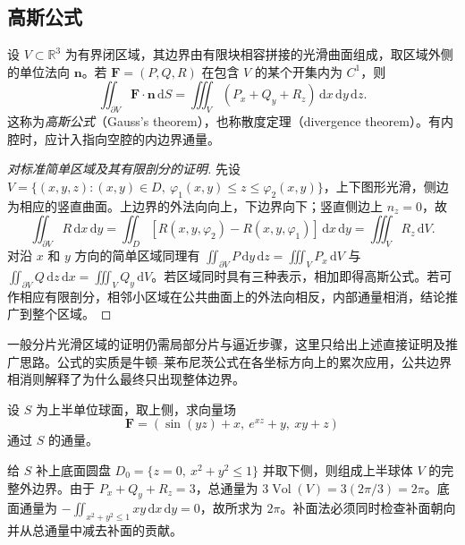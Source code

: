 \documentclass[UTF8,12pt,a4paper,fontset=fandol]{ctexbook}
\begin{document}
\subsection{高斯公式}
\label{subsec:gauss-formula}

\begin{theorem}[高斯公式]
\label{thm:gauss-formula}
设 $V\subset\mathbb R^3$ 为有界闭区域，其边界由有限块相容拼接的光滑曲面组成，取区域外侧的单位法向 $\boldsymbol n$。若 $\boldsymbol F=(P,Q,R)$ 在包含 $V$ 的某个开集内为 $C^1$，则
\begin{equation}
\label{eq:gauss-formula}
    \iint_{\partial V}\boldsymbol F\cdot\boldsymbol n\,\mathrm dS
    =\iiint_V(P_x+Q_y+R_z)\,\mathrm dx\,\mathrm dy\,\mathrm dz.
\end{equation}
这称为\emph{高斯公式}（Gauss's theorem），也称散度定理（divergence theorem）。有内腔时，应计入指向空腔的内边界通量。
\end{theorem}

\begin{proof}[对标准简单区域及其有限剖分的证明]
先设 $V=\{(x,y,z):(x,y)\in D,\ \varphi_1(x,y)\leq z\leq\varphi_2(x,y)\}$，上下图形光滑，侧边为相应的竖直曲面。上边界的外法向向上，下边界向下；竖直侧边上 $n_z=0$，故
\[
    \iint_{\partial V}R\,\mathrm dx\,\mathrm dy
    =\iint_D[R(x,y,\varphi_2)-R(x,y,\varphi_1)]\,\mathrm dx\,\mathrm dy
    =\iiint_V R_z\,\mathrm dV.
\]
对沿 $x$ 和 $y$ 方向的简单区域同理有 $\iint_{\partial V}P\,\mathrm dy\,\mathrm dz=\iiint_VP_x\,\mathrm dV$ 与 $\iint_{\partial V}Q\,\mathrm dz\,\mathrm dx=\iiint_VQ_y\,\mathrm dV$。若区域同时具有三种表示，相加即得高斯公式。若可作相应有限剖分，相邻小区域在公共曲面上的外法向相反，内部通量相消，结论推广到整个区域。
\end{proof}

一般分片光滑区域的证明仍需局部分片与逼近步骤，这里只给出上述直接证明及推广思路。公式的实质是牛顿--莱布尼茨公式在各坐标方向上的累次应用，公共边界相消则解释了为什么最终只出现整体边界。

\begin{example}
\label{ex:gauss-close-hemisphere}
设 $S$ 为上半单位球面，取上侧，求向量场
\[
    \boldsymbol F=(\sin(yz)+x,\ e^{xz}+y,\ xy+z)
\]
通过 $S$ 的通量。
\end{example}
\begin{solve}
给 $S$ 补上底面圆盘 $D_0=\{z=0,\ x^2+y^2\leq1\}$ 并取下侧，则组成上半球体 $V$ 的完整外边界。由于 $P_x+Q_y+R_z=3$，总通量为 $3\operatorname{Vol}(V)=3(2\pi/3)=2\pi$。底面通量为 $-\iint_{x^2+y^2\leq1}xy\,\mathrm dx\,\mathrm dy=0$，故所求为 $2\pi$。补面法必须同时检查补面朝向并从总通量中减去补面的贡献。
\end{solve}
\end{document}

